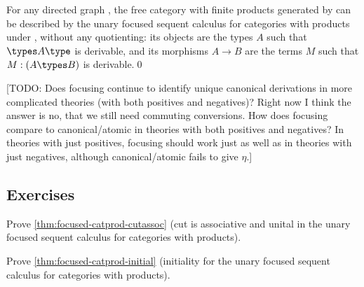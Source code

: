 \begin{thm}\label{thm:focused-catprod-initial}
  For any directed graph \cG, the free category with finite products generated by \cG can be described by the unary focused sequent calculus for categories with products under \cG, without any quotienting: its objects are the types $A$ such that $\types A\type$ is derivable, and its morphisms $A\to B$ are the terms $M$ such that $M:(A \types B)$ is derivable.\qed
\end{thm}


[TODO: Does focusing continue to identify unique canonical derivations in more complicated theories (with both positives and negatives)?  Right now I think the answer is no, that we still need commuting conversions.  How does focusing compare to canonical/atomic in theories with both positives and negatives?  In theories with just positives, focusing should work just as well as in theories with just negatives, although canonical/atomic fails to give $\eta$.]


\subsection*{Exercises}

\begin{ex}\label{ex:focused-catprod-cutassoc}
  Prove \cref{thm:focused-catprod-cutassoc} (cut is associative and unital in the unary focused sequent calculus for categories with products).
\end{ex}

\begin{ex}\label{ex:focused-catprod-initial}
  Prove \cref{thm:focused-catprod-initial} (initiality for the unary focused sequent calculus for categories with products).
\end{ex}


